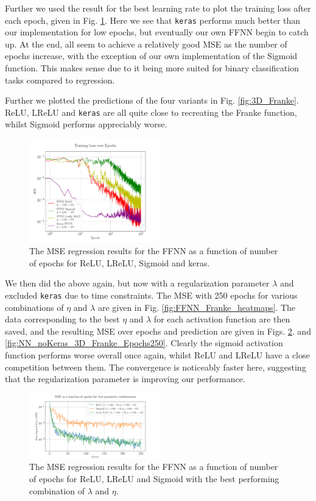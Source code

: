 \documentclass[%
reprint,s
amsmath,amssymb,
aps,
]{revtex4-2}
\begin{document}
Further we used the result for the best learning rate to plot the training loss after each epoch, given in Fig. \ref{fig:NN_Franke_Epochs}. Here we see that \texttt{keras} performs much better than our implementation for low epochs, but eventually our own FFNN begin to catch up. At the end, all seem to achieve a relatively good MSE as the number of epochs increase, with the exception of our own implementation of the Sigmoid function. This makes sense due to it being more suited for binary classification tasks compared to regression.

Further we plotted the predictions of the four variants in Fig. \ref{fig:3D_Franke}. ReLU, LReLU and \texttt{keras} are all quite close to recreating the Franke function, whilst Sigmoid performs appreciably worse.
\begin{figure}[ht!]
	\includegraphics[width=0.5\textwidth]{Figures/NN_MSE_Franke_Epoch.pdf}
	\caption{The MSE regression results for the FFNN as a function of number of epochs for ReLU, LReLU, Sigmoid and keras.}
	\label{fig:NN_Franke_Epochs}
\end{figure}

We then did the above again, but now with a regularization parameter $\lambda$ and excluded \texttt{keras} due to time constraints. The MSE with 250 epochs for various combinations of $\eta$ and $\lambda$ are given in Fig. \ref{fig:FFNN_Franke_heatmaps}. The data corresponding to the best $\eta$ and $\lambda$ for each activation function are then saved, and the resulting MSE over epochs and prediction are given in Figs. \ref{fig:best_MSE_Franke_Epochs}. and \ref{fig:NN_noKeras_3D_Franke_Epochs250}. Clearly the sigmoid activation function performs worse overall once again, whilst ReLU and LReLU have a close competition between them. The convergence is noticeably faster here, suggesting that the regularization parameter is improving our performance.
\begin{figure}[ht!]
	\includegraphics[width=0.5\textwidth]{Figures/Best_MSE_vs_Epochs250.pdf}
	\caption{The MSE regression results for the FFNN as a function of number of epochs for ReLU, LReLU and Sigmoid with the best performing combination of $\lambda$ and $\eta$.}
	\label{fig:best_MSE_Franke_Epochs}
\end{figure}
\end{document}
